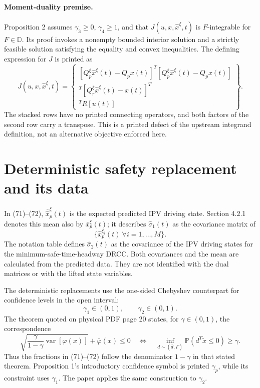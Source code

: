 \documentclass[10pt]{article}
\begin{document}
\paragraph{Moment-duality premise.}
Proposition 2 assumes \(\gamma_3\geq0\), \(\gamma_4\geq1\), and that \(J(u,x,\hat x^\xi,t)\) is \(F\)-integrable for \(F\in\mathbb D\). Its proof invokes a nonempty bounded interior solution and a strictly feasible solution satisfying the equality and convex inequalities. The defining expression for \(J\) is printed as
\begin{equation}
J(u,x,\hat x^\xi,t)=
\left\{\begin{array}{l}
[Q_p^\xi\hat x^\xi(t)-Q_px(t)]^T[Q_p^\xi\hat x^\xi(t)-Q_px(t)]\\
[Q_r^\xi\hat x^\xi(t)-x(t)]^T[Q_r^\xi\hat x^\xi(t)-x(t)]^T\\
[u(t)]^TR[u(t)]
\end{array}\right\}.
\tag{48}
\end{equation}
The stacked rows have no printed connecting operators, and both factors of the second row carry a transpose. This is a printed defect of the upstream integrand definition, not an alternative objective enforced here.

\section*{Deterministic safety replacement and its data}
In (71)--(72), \(\bar{\hat{x}}_p^\xi(t)\) is the expected predicted IPV driving state. Section 4.2.1 denotes this mean also by \(\bar x_p^\xi(t)\); it describes \(\hat\sigma_1(t)\) as the covariance matrix of
\[
\{\hat x_p^{\xi_i}(t)\ \forall i=1,\ldots,M\}.
\]
The notation table defines \(\hat\sigma_2(t)\) as the covariance of the IPV driving states for the minimum-safe-time-headway DRCC. Both covariances and the mean are calculated from the predicted data. They are not identified with the dual matrices or with the lifted state variables.

The deterministic replacements use the one-sided Chebyshev counterpart for confidence levels in the open interval:
\[
\gamma_1\in(0,1),\qquad\gamma_2\in(0,1).
\]
The theorem quoted on physical PDF page 20 states, for \(\gamma\in(0,1)\), the correspondence
\[
\sqrt{\frac{\gamma}{1-\gamma}\operatorname{var}[\varphi(x)]}
+\bar\varphi(x)\leq0
\quad\Longleftrightarrow\quad
\inf_{d\sim(\bar d,\Gamma)}\mathbb P(d^T\tilde x\leq0)\geq\gamma.
\]
Thus the fractions in (71)--(72) follow the denominator \(1-\gamma\) in that stated theorem. Proposition 1's introductory confidence symbol is printed \(\gamma_p\), while its constraint uses \(\gamma_1\). The paper applies the same construction to \(\gamma_2\).
\end{document}

